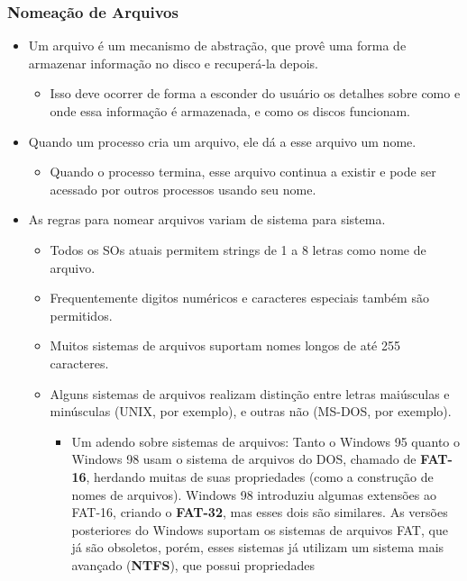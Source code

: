\documentclass[10pt]{article}
\begin{document}
\subsubsection{Nomeação de Arquivos}
\begin{itemize}
    \item Um arquivo é um mecanismo de abstração, que provê uma forma de armazenar
    informação no disco e recuperá-la depois. 
    \begin{itemize}
        \item Isso deve ocorrer de forma a esconder do usuário os detalhes sobre como
        e onde essa informação é armazenada, e como os discos funcionam.
    \end{itemize}
    \item Quando um processo cria um arquivo, ele dá a esse arquivo um nome.
    \begin{itemize}
        \item Quando o processo termina, esse arquivo continua a existir e pode ser acessado
        por outros processos usando seu nome.
    \end{itemize}
    \item As regras para nomear arquivos variam de sistema para sistema.
    \begin{itemize}
        \item Todos os SOs atuais permitem strings de 1 a 8 letras como nome de arquivo.
        \item Frequentemente digitos numéricos e caracteres especiais também são permitidos.
        \item Muitos sistemas de arquivos suportam nomes longos de até 255 caracteres.
        \item Alguns sistemas de arquivos realizam distinção entre letras maiúsculas
        e minúsculas (UNIX, por exemplo), e outras não (MS-DOS, por exemplo).
        \begin{itemize}
            \item Um adendo sobre sistemas de arquivos: Tanto o Windows 95 quanto o 
            Windows 98 usam o sistema de arquivos do DOS, chamado de \textbf{FAT-16},
            herdando muitas de suas propriedades (como a construção de nomes de arquivos).
            Windows 98 introduziu algumas extensões ao FAT-16, criando o \textbf{FAT-32},
            mas esses dois são similares. As versões posteriores do Windows suportam os 
            sistemas de arquivos FAT, que já são obsoletos, porém, esses sistemas já 
            utilizam um sistema mais avançado (\textbf{NTFS}), que possui propriedades

\end{itemize}
\end{itemize}
\end{itemize}
\end{document}
